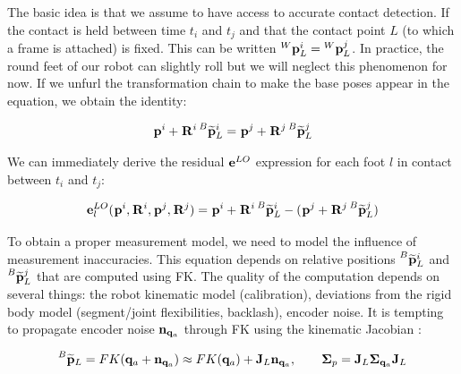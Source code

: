 The basic idea is that we assume to have access to accurate contact detection. If the contact is held between time $t_i$ and $t_j$ and that
the contact point $L$ (to which a frame is attached) is fixed. This can be written $\prescript{W}{}{{\bf p}}_{L}^i = \prescript{W}{}{{\bf p}}_{L}^j$. 
In practice, the round feet of our robot can slightly roll but we will neglect this phenomenon for now. 
If we unfurl the transformation chain to make the base poses appear in the equation, we obtain the identity:

\begin{equation}
    \prescript{}{}{{\bf p}}_{}^i + \prescript{}{}{{\bf R}}_{}^i \prescript{B}{}{\widetilde{{\bf p}}}_{L}^i = \prescript{}{}{{\bf p}}_{}^j + \prescript{}{}{{\bf R}}_{}^j \prescript{B}{}{\widetilde{{\bf p}}}_{L}^j
\end{equation}

We can immediately derive the residual ${\bf e}^{LO}$ expression for each foot $l$ in contact between $t_i$ and $t_j$:

\begin{equation}
    {\bf e}^{LO}_l(\prescript{}{}{{\bf p}}_{}^i, \prescript{}{}{{\bf R}}_{}^i, \prescript{}{}{{\bf p}}_{}^j, \prescript{}{}{{\bf R}}_{}^j) = \prescript{}{}{{\bf p}}_{}^i + \prescript{}{}{{\bf R}}_{}^i \prescript{B}{}{\widetilde{{\bf p}}}_{L}^i - (\prescript{}{}{{\bf p}}_{}^j + \prescript{}{}{{\bf R}}_{}^j \prescript{B}{}{\widetilde{{\bf p}}}_{L}^j)
\end{equation}

To obtain a proper measurement model, we need to model the influence of measurement inaccuracies.
This equation depends on relative positions $\prescript{B}{}{\widetilde{{\bf p}}}_{L}^i$ and $\prescript{B}{}{\widetilde{{\bf p}}}_{L}^j$ that are computed using FK. The quality of the computation depends on several things:
the robot kinematic model (calibration), deviations from the rigid body model (\eg segment/joint flexibilities, backlash), encoder noise.
It is tempting to propagate encoder noise ${\bf n}_{{\bf q}_a}$ through FK using the kinematic Jacobian \cite{bloesch2013state, hartley2018legged}:

\begin{equation}
    \prescript{B}{}{\widetilde{{\bf p}}}_{L} = FK({\bf q}_a + {\bf n}_{{\bf q}_a}) \approx FK({\bf q}_a) + {\bf J}_L{\bf n}_{{\bf q}_a}, \quad \quad {\bm \Sigma}_{p} = {\bf J}_L {\bm \Sigma}_{{\bf q}_a} {\bf J}_L
\end{equation}

